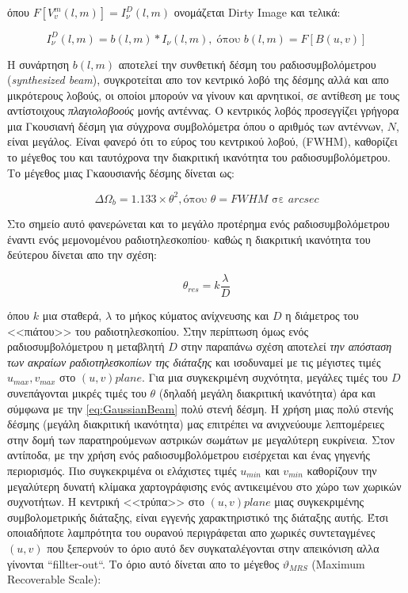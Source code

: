 όπου $F[V^{m}_v(l,m)]=I^{D}_{\nu}(l,m)$ ονομάζεται {\en Dirty Image} και τελικά:

\begin{equation}\label{InverFourierDirtyIMage2}
I^{D}_{\nu}(l,m) =  b(l,m)*I_{\nu}(l,m), \; \text{όπου $b(l,m)=F[B(u,v)]$}
\end{equation}

Η συνάρτηση $b(l,m)$ αποτελεί την συνθετική δέσμη του ραδιοσυμβολόμετρου {\en ({\it synthesized beam})}, συγκροτείται απο τον κεντρικό λοβό της δέσμης αλλά και απο μικρότερους λοβούς, οι οποίοι μπορούν να γίνουν και αρνητικοί, σε αντίθεση με τους αντίστοιχους {\it πλαγιολοβοούς} μονής αντέννας.
Ο κεντρικός λοβός προσεγγίζει γρήγορα μια Γκουσιανή δέσμη για σύγχρονα συμβολόμετρα όπου ο αριθμός των αντέννων, $N$, είναι μεγάλος. Είναι φανερό ότι το εύρος του κεντρικού λοβού, {\en (FWHM)}, καθορίζει το μέγεθος του και ταυτόχρονα την διακριτική ικανότητα του ραδιοσυμβολόμετρου. Το μέγεθος μιας Γκαουσιανής δέσμης δίνεται ως:

\begin{equation}\label{eq:GaussianBeam}
  \Delta\Omega_b = 1.133\times \theta^2, \text{όπου $\theta= FWHM$ σε $arcsec$}
\end{equation}

Στο σημείο αυτό φανερώνεται και το μεγάλο προτέρημα ενός ραδιοσυμβολόμετρου έναντι ενός μεμονομένου ραδιοτηλεσκοπίου$\cdot$ καθώς η διακριτική ικανότητα του δεύτερου δίνεται απο την σχέση:

\begin{equation}\label{eq:AnguralResolution}
\theta_{res} = k \frac{\lambda}{D}
\end{equation}   

όπου $k$ μια σταθερά, $\lambda$ το μήκος κύματος ανίχνευσης και $D$ η διάμετρος του <<πιάτου>> του ραδιοτηλεσκοπίου. Στην περίπτωση όμως ενός ραδιοσυμβολόμετρου η μεταβλητή $D$ στην παραπάνω σχέση αποτελεί {\it την απόσταση των ακραίων ραδιοτηλεσκοπίων της διάταξης} και ισοδυναμεί με τις μέγιστες τιμές $u_{max},v_{max}$ στο $(u,v) plane$. Για μια συγκεκριμένη συχνότητα, μεγάλες τιμές του $D$ συνεπάγονται μικρές τιμές του $\theta$ (δηλαδή μεγάλη διακριτική ικανότητα) άρα και σύμφωνα με την \eqref{eq:GaussianBeam} πολύ στενή δέσμη. Η χρήση μιας πολύ στενής δέσμης (μεγάλη διακριτική ικανότητα) μας επιτρέπει να ανιχνεύουμε λεπτομέρειες στην δομή των παρατηρούμενων αστρικών σωμάτων με μεγαλύτερη ευκρίνεια. Στον αντίποδα, με την χρήση ενός ραδιοσυμβολόμετρου εισέρχεται και ένας γηγενής περιορισμός. Πιο συγκεκριμένα οι ελάχιστες τιμές $u_{min}$ και $v_{min}$ καθορίζουν την μεγαλύτερη δυνατή κλίμακα χαρτογράφισης ενός αντικειμένου στο χώρο των χωρικών συχνοτήτων. Η κεντρική <<τρύπα>> στο $(u,v) plane$ μιας συγκεκριμένης συμβολομετρικής διάταξης, είναι εγγενής χαρακτηριστικό της διάταξης αυτής. Έτσι οποιαδήποτε λαμπρότητα του ουρανού περιγράφεται απο χωρικές συντεταγμένες $(u,v)$ που ξεπερνούν το όριο αυτό δεν συγκαταλέγονται στην απεικόνιση αλλα γίνονται {\en ``fillter-out``}. Το όριο αυτό δίνεται απο το μέγεθος $\vartheta_{MRS}$ ({\en Maximum Recoverable Scale}):

